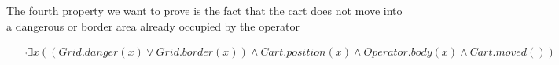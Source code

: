 The fourth property we want to prove is the fact that the cart does not move into a dangerous or border area already occupied by the operator

\begin{align*}
  &\neg \exists x ((Grid.danger (x) \lor Grid.border(x)) \land Cart.position(x) \land Operator.body(x) \land Cart.moved())
\end{align*}
















